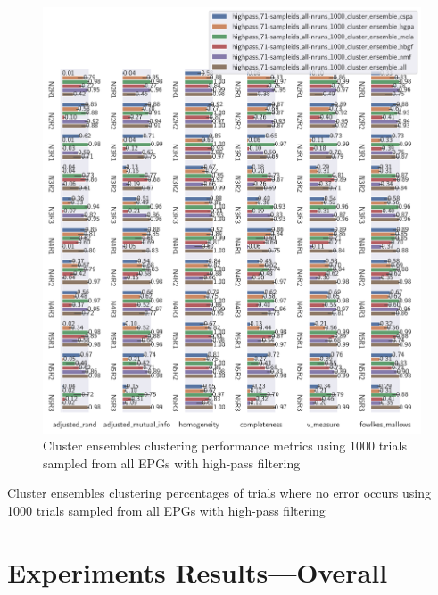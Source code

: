 \begin{theappendices}
\begin{figure}[H]
\centering
\includegraphics[width=\textwidth]{./figures/clust_comparison/highpass_71-sampleids_all-nruns_1000_cluster_ensembles.pdf}
\caption{Cluster ensembles clustering performance metrics using 1000 trials sampled from all EPGs with high-pass filtering}
\label{fig:highpass_71-sampleids_all-nruns_1000_cluster_ensembles}
\end{figure}

\begin{table}[H]
\centering
{}
\caption{Cluster ensembles clustering percentages of trials where no error occurs using 1000 trials sampled from all EPGs with high-pass filtering}
\label{table:highpass_71-sampleids_all-nruns_1000_cluster_ensembles}
\end{table}

\section{Experiments Results---Overall}


\end{theappendices}

